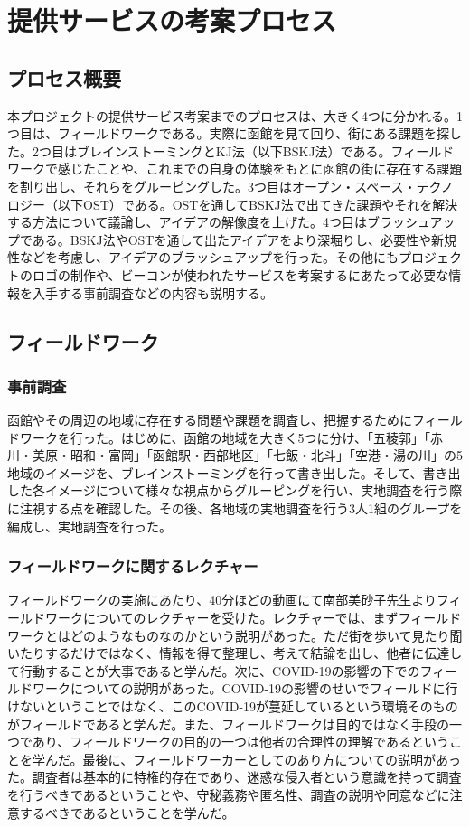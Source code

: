 \chapter{提供サービスの考案プロセス}
\section{プロセス概要}
本プロジェクトの提供サービス考案までのプロセスは、大きく4つに分かれる。1つ目は、フィールドワークである。実際に函館を見て回り、街にある課題を探した。2つ目はブレインストーミングとKJ法（以下BSKJ法）である。フィールドワークで感じたことや、これまでの自身の体験をもとに函館の街に存在する課題を割り出し、それらをグルーピングした。3つ目はオープン・スペース・テクノロジー（以下OST）である。OSTを通してBSKJ法で出てきた課題やそれを解決する方法について議論し、アイデアの解像度を上げた。4つ目はブラッシュアップである。BSKJ法やOSTを通して出たアイデアをより深堀りし、必要性や新規性などを考慮し、アイデアのブラッシュアップを行った。その他にもプロジェクトのロゴの制作や、ビーコンが使われたサービスを考案するにあたって必要な情報を入手する事前調査などの内容も説明する。

\section{フィールドワーク}

\subsection{事前調査}
函館やその周辺の地域に存在する問題や課題を調査し、把握するためにフィールドワークを行った。はじめに、函館の地域を大きく5つに分け、「五稜郭」「赤川・美原・昭和・富岡」「函館駅・西部地区」「七飯・北斗」「空港・湯の川」の5地域のイメージを、ブレインストーミングを行って書き出した。そして、書き出した各イメージについて様々な視点からグルーピングを行い、実地調査を行う際に注視する点を確認した。その後、各地域の実地調査を行う3人1組のグループを編成し、実地調査を行った。


\subsection{フィールドワークに関するレクチャー}
フィールドワークの実施にあたり、40分ほどの動画にて南部美砂子先生よりフィールドワークについてのレクチャーを受けた。レクチャーでは、まずフィールドワークとはどのようなものなのかという説明があった。ただ街を歩いて見たり聞いたりするだけではなく、情報を得て整理し、考えて結論を出し、他者に伝達して行動することが大事であると学んだ。次に、COVID-19の影響の下でのフィールドワークについての説明があった。COVID-19の影響のせいでフィールドに行けないということではなく、このCOVID-19が蔓延しているという環境そのものがフィールドであると学んだ。また、フィールドワークは目的ではなく手段の一つであり、フィールドワークの目的の一つは他者の合理性の理解であるということを学んだ。最後に、フィールドワーカーとしてのあり方についての説明があった。調査者は基本的に特権的存在であり、迷惑な侵入者という意識を持って調査を行うべきであるということや、守秘義務や匿名性、調査の説明や同意などに注意するべきであるということを学んだ。

